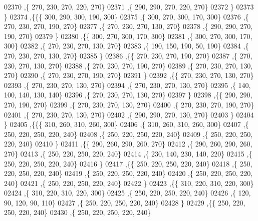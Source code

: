 \begin{DoxyCode}
02370     ,\{   270,   230,   270,   220,   270\}
02371     ,\{   290,   290,   270,   220,   270\}
02372     \}
02373    \}
02374   ,\{\{\{   300,   290,   300,   190,   300\}
02375     ,\{   300,   270,   300,   170,   300\}
02376     ,\{   270,   230,   270,   190,   270\}
02377     ,\{   270,   230,   270,   130,   270\}
02378     ,\{   290,   290,   270,   190,   270\}
02379     \}
02380    ,\{\{   300,   270,   300,   170,   300\}
02381     ,\{   300,   270,   300,   170,   300\}
02382     ,\{   270,   230,   270,   130,   270\}
02383     ,\{   190,   150,   190,    50,   190\}
02384     ,\{   270,   230,   270,   130,   270\}
02385     \}
02386    ,\{\{   270,   230,   270,   190,   270\}
02387     ,\{   270,   230,   270,   130,   270\}
02388     ,\{   270,   230,   270,   190,   270\}
02389     ,\{   270,   230,   270,   130,   270\}
02390     ,\{   270,   230,   270,   190,   270\}
02391     \}
02392    ,\{\{   270,   230,   270,   130,   270\}
02393     ,\{   270,   230,   270,   130,   270\}
02394     ,\{   270,   230,   270,   130,   270\}
02395     ,\{   140,   100,   140,   130,   140\}
02396     ,\{   270,   230,   270,   130,   270\}
02397     \}
02398    ,\{\{   290,   290,   270,   190,   270\}
02399     ,\{   270,   230,   270,   130,   270\}
02400     ,\{   270,   230,   270,   190,   270\}
02401     ,\{   270,   230,   270,   130,   270\}
02402     ,\{   290,   290,   270,   130,   270\}
02403     \}
02404    \}
02405   ,\{\{\{   310,   260,   310,   260,   300\}
02406     ,\{   310,   260,   310,   260,   300\}
02407     ,\{   250,   220,   250,   220,   240\}
02408     ,\{   250,   220,   250,   220,   240\}
02409     ,\{   250,   220,   250,   220,   240\}
02410     \}
02411    ,\{\{   290,   260,   290,   260,   270\}
02412     ,\{   290,   260,   290,   260,   270\}
02413     ,\{   250,   220,   250,   220,   240\}
02414     ,\{   230,   140,   230,   140,   220\}
02415     ,\{   250,   220,   250,   220,   240\}
02416     \}
02417    ,\{\{   250,   220,   250,   220,   240\}
02418     ,\{   250,   220,   250,   220,   240\}
02419     ,\{   250,   220,   250,   220,   240\}
02420     ,\{   250,   220,   250,   220,   240\}
02421     ,\{   250,   220,   250,   220,   240\}
02422     \}
02423    ,\{\{   310,   220,   310,   220,   300\}
02424     ,\{   310,   220,   310,   220,   300\}
02425     ,\{   250,   220,   250,   220,   240\}
02426     ,\{   120,    90,   120,    90,   110\}
02427     ,\{   250,   220,   250,   220,   240\}
02428     \}
02429    ,\{\{   250,   220,   250,   220,   240\}
02430     ,\{   250,   220,   250,   220,   240\}

\end{DoxyCode}
